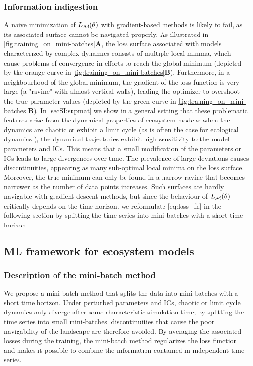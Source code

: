 \subsubsection{Information indigestion}
A naive minimization of $L_{\mathcal{M}}(\theta)$ with gradient-based methods is likely to fail, as its associated surface cannot be navigated properly. As illustrated in \cref{fig:training_on_mini-batches}\textbf{A}, the loss surface associated with models characterized by complex dynamics consists of multiple local minima, which cause problems of convergence in efforts to reach the global minimum (depicted by the orange curve in \cref{fig:training_on_mini-batches}\textbf{B}). Furthermore, in a neighbourhood of the global minimum, the gradient of the loss function is very large (a "ravine" with almost vertical walls), leading the optimizer to overshoot the true parameter values (depicted by the green curve in \cref{fig:training_on_mini-batches}\textbf{B}).
%
In \cref{secSI:supmat} we show in a general setting that these problematic features arise from the dynamical properties of ecosystem models: when the dynamics are chaotic or exhibit a limit cycle (as is often the case for ecological dynamics \cite{Bjornstad2001,Hastings1993,Huisman1999,Beninca2008}), the dynamical trajectories exhibit high sensitivity to the model parameters and ICs. This means that a small modification of the parameters or ICs leads to large divergences over time. 
%
The prevalence of large deviations causes discontinuities, appearing as many sub-optimal local minima on the loss surface. Moreover, the true minimum can only be found in a narrow ravine that becomes narrower as the number of data points increases.
% 
Such surfaces are hardly navigable with gradient descent methods, but since the behaviour of $L_{\mathcal{M}}(\theta)$ critically depends on the time horizon, we reformulate \cref{eq:loss_fn} in the following section by splitting the time series into mini-batches with a short time horizon. 

\subsection{ML framework for ecosystem models}

\subsubsection{Description of the mini-batch method}
We propose a mini-batch method that splits the data into mini-batches with a short time horizon. Under perturbed parameters and ICs, chaotic or limit cycle dynamics only diverge after some characteristic simulation time; by splitting the time series into small mini-batches, discontinuities that cause the poor navigability of the landscape are therefore avoided. By averaging the associated losses during the training, the mini-batch method regularizes the loss function and makes it possible to combine the information contained in independent time series.

